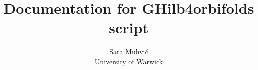 \documentclass[12pt]{article}
\begin{document}

\title{Documentation for GHilb4orbifolds script}

\author{Sara Muhvi\'{c} \\ University of Warwick}

\maketitle

\tableofcontents{}

\renewcommand{\thepart}{\Alph{part}}%


\newpage


\newpage

 
\end{document}
